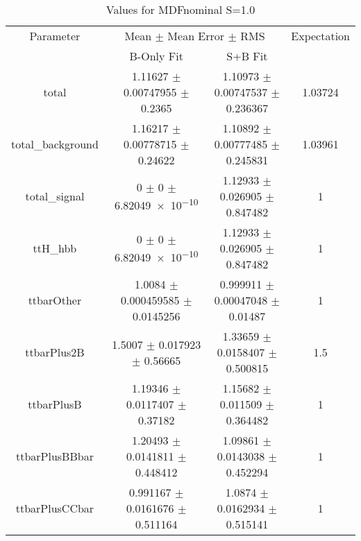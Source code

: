 \begin{table}
\centering
\caption{Values for MDFnominal S=1.0}
\begin{tabular}{cccc}
\toprule
Parameter & \multicolumn{2}{c}{Mean $\pm$ Mean Error $\pm$ RMS} & Expectation\\
 & B-Only Fit & S+B Fit & \\
\midrule
total & \num{1.11627} $\pm$ \num{0.00747955} $\pm$ \num{0.2365} & \num{1.10973} $\pm$ \num{0.00747537} $\pm$ \num{0.236367} & \num{1.03724}\\
total\_background & \num{1.16217} $\pm$ \num{0.00778715} $\pm$ \num{0.24622} & \num{1.10892} $\pm$ \num{0.00777485} $\pm$ \num{0.245831} & \num{1.03961}\\
total\_signal & \num{0} $\pm$ \num{0} $\pm$ \num{6.82049e-10} & \num{1.12933} $\pm$ \num{0.026905} $\pm$ \num{0.847482} & \num{1}\\
ttH\_hbb & \num{0} $\pm$ \num{0} $\pm$ \num{6.82049e-10} & \num{1.12933} $\pm$ \num{0.026905} $\pm$ \num{0.847482} & \num{1}\\
ttbarOther & \num{1.0084} $\pm$ \num{0.000459585} $\pm$ \num{0.0145256} & \num{0.999911} $\pm$ \num{0.00047048} $\pm$ \num{0.01487} & \num{1}\\
ttbarPlus2B & \num{1.5007} $\pm$ \num{0.017923} $\pm$ \num{0.56665} & \num{1.33659} $\pm$ \num{0.0158407} $\pm$ \num{0.500815} & \num{1.5}\\
ttbarPlusB & \num{1.19346} $\pm$ \num{0.0117407} $\pm$ \num{0.37182} & \num{1.15682} $\pm$ \num{0.011509} $\pm$ \num{0.364482} & \num{1}\\
ttbarPlusBBbar & \num{1.20493} $\pm$ \num{0.0141811} $\pm$ \num{0.448412} & \num{1.09861} $\pm$ \num{0.0143038} $\pm$ \num{0.452294} & \num{1}\\
ttbarPlusCCbar & \num{0.991167} $\pm$ \num{0.0161676} $\pm$ \num{0.511164} & \num{1.0874} $\pm$ \num{0.0162934} $\pm$ \num{0.515141} & \num{1}\\
\bottomrule
\end{tabular}
\end{table}